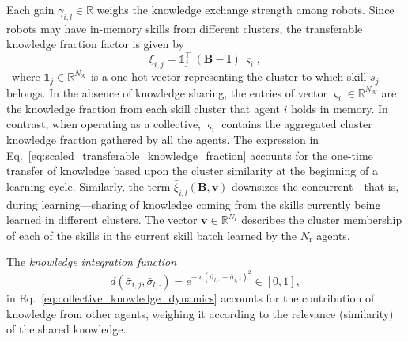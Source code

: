 \documentclass[12pt]{article}
\renewcommand{\emph}[1]{\textit{#1}}
\begin{document}
Each gain $\gamma_{i,l} \in \mathbb{R} $ weighs the knowledge exchange strength among robots. Since robots may have in-memory skills from different clusters, the transferable knowledge fraction factor is given by
\begin{equation}\label{eq:scaled_transferable_knowledge_fraction}
	{\xi}_{i,j} = \mathbb{1}^\intercal_j\:(\bm{B} - \bm{I})\:\bm{\varsigma}_i ,
\end{equation}
\noindent~where $\mathbb{1}_j \in \mathbb{R}^{N_\mathcal{K}}$ is a one-hot vector representing the cluster to which skill $s_j$ belongs. In the absence of knowledge sharing, the entries of vector $\bm{\varsigma}_i \in \mathbb{R}^{N_\mathcal{K}}$ are the knowledge fraction from each skill cluster that agent $i$ holds in memory. In contrast, when operating as a collective, $\bm{\varsigma}_i$ contains the aggregated cluster knowledge fraction gathered by all the agents. The expression in Eq.~\eqref{eq:scaled_transferable_knowledge_fraction} accounts for the one-time transfer of knowledge based upon the cluster similarity at the beginning of a learning cycle. Similarly, the term $ \bar{\xi}_{i,l}(\bm{B},\bm{v}) $ downsizes the concurrent---that is, during learning---sharing of knowledge coming from the skills currently being learned in different clusters. The vector $\bm{v} \in \mathbb{R}^{N_\mathrm{r}}$ describes the cluster membership of each of the skills in the current skill batch learned by the $N_\mathrm{r}$ agents. 





The \emph{knowledge integration function} 
\begin{equation}\label{eq:knowledge_integration_function}
	d(\bar{\sigma}_{i,j},\bar{\sigma}_{l,\cdot}) = e^{-a\:\left(\bar{\sigma}_{l,\cdot}-\bar{\sigma}_{i,j}\right)^2}\in [0,1],
\end{equation}
\noindent in Eq.~\eqref{eq:collective_knowledge_dynamics} accounts for the contribution of knowledge from other agents, weighing it according to the relevance (similarity) of the shared knowledge. 

\end{document}
